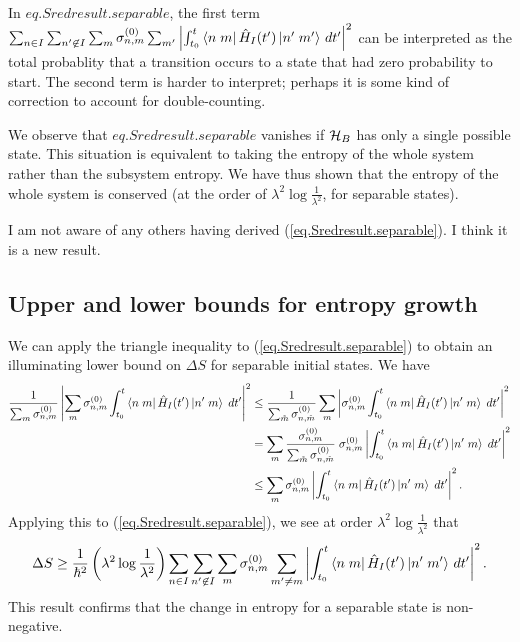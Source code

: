 In \({eq.Sredresult.separable}\), the first term \(\sum_{n\in I}\sum_{n^\prime \not\in I}\sum_m \sigma_{n,m}^{(0)} \sum_{m^\prime} \left|\int_{t_0}^t \left\langle n\;m\right|\hat{H}_I (t^{\prime})\left|n^\prime\;m^\prime\right\rangle \,dt^{\prime}\right|^2\) can be interpreted as the total probablity that a transition occurs to a state that had zero probability to start. The second term is harder to interpret; perhaps it is some kind of correction to account for double-counting.

We observe that \({eq.Sredresult.separable}\) vanishes if \(\mathcal{H}_B\) has only a single possible state. This situation is equivalent to taking the entropy of the whole system rather than the subsystem entropy. We have thus shown that the entropy of the whole system is conserved (at the order of \(\lambda^2 \log\frac{1}{\lambda^2}\), for separable states).

I am not aware of any others having derived (\ref{eq.Sredresult.separable}). I think it is a new result.


\subsection{Upper and lower bounds for entropy growth}

We can apply the triangle inequality to (\ref{eq.Sredresult.separable}) to obtain an illuminating lower bound on \(\Delta S\) for separable initial states. We have
\begin{align*}
\frac{1}{\sum_m \sigma_{n,m}^{(0)}} \left|\sum_m{\sigma_{n,m}^{(0)}}\int_{t_0}^t \left\langle n\;m\right| \hat{H}_I(t^\prime) 
 \left|n^\prime\;m\right\rangle\;dt^\prime \right|^2
& \leq \frac{1}{\sum_{\tilde{m}} \sigma_{n,\tilde{m}}^{(0)}} \sum_{m} \left|{\sigma_{n,m}^{(0)}}\int_{t_0}^t \left\langle n\;m\right| \hat{H}_I(t^\prime) 
 \left|n^\prime\;m\right\rangle\;dt^\prime \right|^2 \\
 &= \sum_m \frac{\sigma_{n,m}^{(0)}}{\sum_{\tilde{m}} \sigma_{n,\tilde{m}}^{(0)}} \;\sigma_{n,m}^{(0)} \left|\int_{t_0}^t \left\langle n\;m\right| \hat{H}_I(t^\prime) 
 \left|n^\prime\;m\right\rangle\;dt^\prime \right|^2 \\
 &\leq \sum_m \sigma_{n,m}^{(0)} \left|\int_{t_0}^t \left\langle n\;m\right| \hat{H}_I(t^\prime) 
 \left|n^\prime\;m\right\rangle\;dt^\prime \right|^2.
\end{align*}
Applying this to (\ref{eq.Sredresult.separable}), we see at order \(\lambda^2 \log \frac{1}{\lambda^2}\) that
\[
\Delta S \geq \frac{1}{\hbar^2}\left(\lambda^2 \log\frac{1}{\lambda^2}\right) \sum_{n\in I}\sum_{n^\prime \not\in I} \sum_m \sigma_{n,m}^{(0)} \sum_{m^\prime \neq m} \left|\int_{t_0}^t \left\langle n\;m\right|\hat{H}_I (t^{\prime})\left|n^\prime\;m^\prime\right\rangle \,dt^{\prime}\right|^2.
\]
This result confirms that the change in entropy for a separable state is non-negative.

